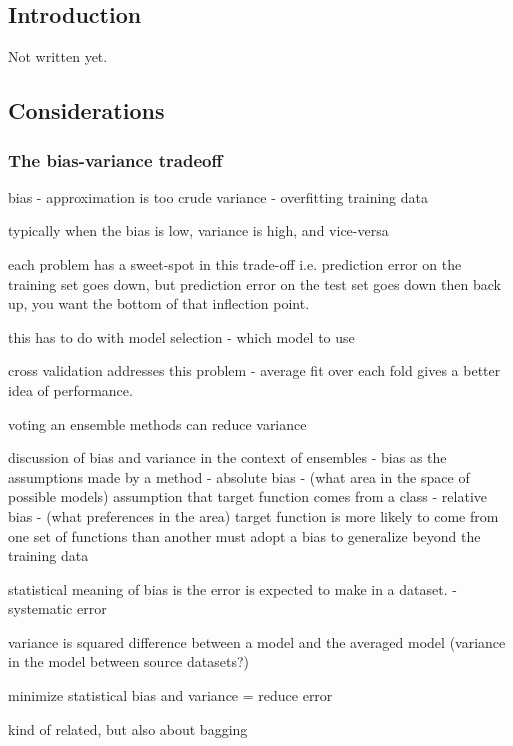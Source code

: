 


\begin{bibunit}

\chapter{Introduction}
\label{chap:intro}

Not written yet.




\section{Considerations}


\subsection{The bias-variance tradeoff}

bias - approximation is too crude
variance - overfitting training data

typically when the bias is low, variance is high, and vice-versa

each problem has a sweet-spot in this trade-off
i.e. prediction error on the training set goes down, but prediction error on the test set goes down then back up, you want the bottom of that inflection point.

this has to do with model selection - which model to use

cross validation addresses this problem - average fit over each fold gives a better idea of performance.

voting an ensemble methods can reduce variance

discussion of bias and variance in the context of ensembles \cite{Dietterich1995}
- bias as the assumptions made by a method
- absolute bias - (what area in the space of possible models) assumption that target function comes from a class
- relative bias - (what preferences in the area) target function is more likely to come from one set of functions than another
must adopt a bias to generalize beyond the training data

statistical meaning of bias is the error is expected to make in a dataset. - systematic error

variance is squared difference between a model and the averaged model (variance in the model between source datasets?)

minimize statistical bias and variance = reduce error


kind of related, but also about bagging \cite{Tibshirani1996a}


\renewcommand{\bibsection}{\section{\bibname}}
\putbib
\end{bibunit}
